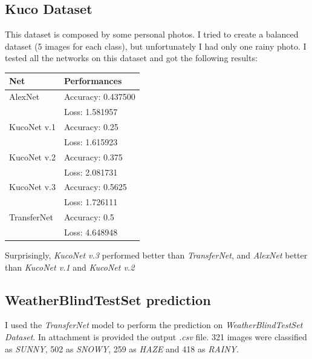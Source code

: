 \documentclass[11pt]{article}
\begin{document}
\subsection{Kuco Dataset}
This dataset is composed by some personal photos. I tried to create a balanced dataset (5 images for each class), but unfortunately I had only one rainy photo. I tested all the networks on this dataset and got the following results: \\
\begin{table}[H]
	\begin{center}
		\begin{tabular}{|p{}|p{}|}
			\hline
			\textbf{Net} & \textbf{Performances} \\
			\hline
			AlexNet & Accuracy: 0.437500 \\
			\cline{2-2}
					& Loss: 1.581957 \\
			\hline
			KucoNet v.1 & Accuracy: 0.25 \\
			\cline{2-2}
						& Loss: 1.615923 \\
			\hline
			KucoNet v.2 & Accuracy: 0.375 \\
			\cline{2-2}
						& Loss: 2.081731 \\
			\hline
			KucoNet v.3 & Accuracy: 0.5625 \\
			\cline{2-2}
						& Loss: 1.726111 \\
			\hline
			TransferNet & Accuracy: 0.5 \\
			\cline{2-2}
						& Loss: 4.648948 \\
			\hline
		\end{tabular}
	\end{center}
\end{table}
Surprisingly, \textit{KucoNet v.3} performed better than \textit{TransferNet}, and \textit{AlexNet} better than \textit{KucoNet v.1} and \textit{KucoNet v.2}

\subsection{WeatherBlindTestSet prediction}
I used the \textit{TransferNet} model to perform the prediction on \textit{WeatherBlindTestSet Dataset}. In attachment is provided the output \textit{.csv} file. 321 images were classified as \textit{SUNNY}, 502 as \textit{SNOWY}, 259 as \textit{HAZE} and 418 as \textit{RAINY}.
\end{document}
